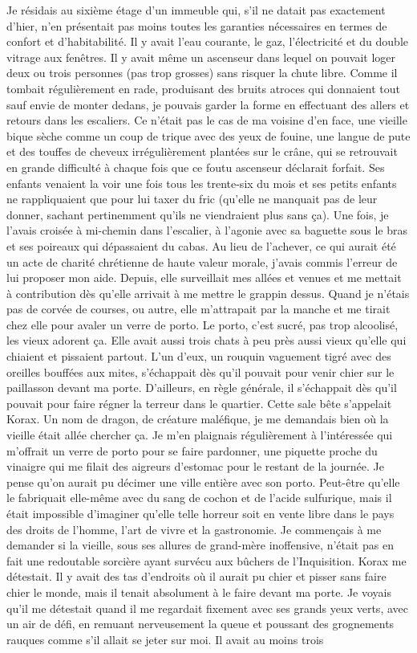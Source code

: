 Je résidais au sixième étage d’un immeuble qui, s’il ne datait pas exactement d’hier, n’en présentait pas moins toutes les garanties nécessaires en termes de confort et d’habitabilité. Il y avait l’eau courante, le gaz, l’électricité et du double vitrage aux fenêtres. Il y avait même un ascenseur dans lequel on pouvait loger deux ou trois personnes (pas trop grosses) sans risquer la chute libre. Comme il tombait régulièrement en rade, produisant des bruits atroces qui donnaient tout sauf envie de monter dedans, je pouvais garder la forme en effectuant des allers et retours dans les escaliers. Ce n’était pas le cas de ma voisine d’en face, une vieille bique sèche comme un coup de trique avec des yeux de fouine, une langue de pute et des touffes de cheveux irrégulièrement plantées sur le crâne, qui se retrouvait en grande difficulté à chaque fois que ce foutu ascenseur déclarait forfait. Ses enfants venaient la voir une fois tous les trente-six du mois et ses petits enfants ne rappliquaient que pour lui taxer du fric (qu’elle ne manquait pas de leur donner, sachant pertinemment qu’ils ne viendraient plus sans ça). Une fois, je l’avais croisée à mi-chemin dans l’escalier, à l’agonie avec sa baguette sous le bras et ses poireaux qui dépassaient du cabas. Au lieu de l’achever, ce qui aurait été un acte de charité chrétienne de haute valeur morale, j’avais commis l’erreur de lui proposer mon aide. Depuis, elle surveillait mes allées et venues et me mettait à contribution dès qu’elle arrivait à me mettre le grappin dessus. Quand je n’étais pas de corvée de courses, ou autre, elle m’attrapait par la manche et me tirait chez elle pour avaler un verre de porto. Le porto, c’est sucré, pas trop alcoolisé, les vieux adorent ça. Elle avait aussi trois chats à peu près aussi vieux qu’elle qui chiaient et pissaient partout. L’un d’eux, un rouquin vaguement tigré avec des oreilles bouffées aux mites, s’échappait dès qu’il pouvait pour venir chier sur le paillasson devant ma porte. D’ailleurs, en règle générale, il s’échappait dès qu’il pouvait pour faire régner la terreur dans le quartier. Cette sale bête s’appelait Korax. Un nom de dragon, de créature maléfique, je me demandais bien où la vieille était allée chercher ça. Je m’en plaignais régulièrement à l’intéressée qui m’offrait un verre de porto pour se faire pardonner, une piquette proche du vinaigre qui me filait des aigreurs d’estomac pour le restant de la journée. Je pense qu’on aurait pu décimer une ville entière avec son porto. Peut-être qu’elle le fabriquait elle-même avec du sang de cochon et de l’acide sulfurique, mais il était impossible d’imaginer qu’elle telle horreur soit en vente libre dans le pays des droits de l’homme, l’art de vivre et la gastronomie. Je commençais à me demander si la vieille, sous ses allures de grand-mère inoffensive, n’était pas en fait une redoutable sorcière ayant survécu aux bûchers de l’Inquisition. Korax me détestait. Il y avait des tas d’endroits où il aurait pu chier et pisser sans faire chier le monde, mais il tenait absolument à le faire devant ma porte. Je voyais qu’il me détestait quand il me regardait fixement avec ses grands yeux verts, avec un air de défi, en remuant nerveusement la queue et poussant des grognements rauques comme s’il allait se jeter sur moi. Il avait au moins trois 